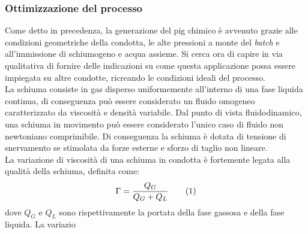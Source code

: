 \subsubsection*{Ottimizzazione del processo}
Come detto in precedenza, la generazione del pig chimico è avvenuto grazie alle condizioni geometriche della condotta, le alte pressioni a monte del \textit{batch} e all'immissione di schiumogeno e acqua assieme. Si cerca ora di capire in via qualitativa di fornire delle indicazioni su come questa applicazione possa essere impiegata su altre condotte, ricreando le condizioni ideali del processo.\\
La schiuma \parencite{karam2013foam} consiste in gas disperso uniformemente all'interno di una fase liquida continua, di conseguenza può essere considerato un fluido omogeneo caratterizzato da viscosità e densità variabile. Dal punto di vista fluidodinamico, una schiuma in movimento può essere considerato l'unico caso di fluido non newtoniano comprimibile. Di conseguenza la schiuma è dotata di tensione di snervamento se stimolata da forze esterne e sforzo di taglio non lineare.\\
La variazione di viscosità di una schiuma in condotta è fortemente legata alla qualità della schiuma, definita come:
\[\Gamma=\dfrac{Q_G}{Q_G+Q_L} \addtag \]
dove \(Q_G\) e \(Q_L\) sono rispettivamente la portata della fase gassosa e della fase liquida. La variazio

\clearpage{\pagestyle{empty}\cleardoublepage}